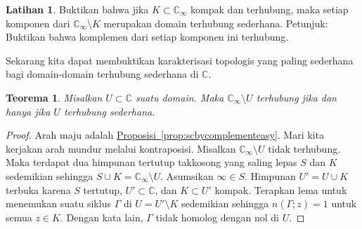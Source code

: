 \documentclass[12pt,openany]{book}
\newcommand{\C}{{\mathbb{C}}}
\theoremstyle{plain}
\newtheorem{thm}{Teorema}[section]
\theoremstyle{remark}
\theoremstyle{definition}
\newenvironment{exbox}{%
    \def\FrameCommand{\vrule width 1pt \relax\hspace{10pt}}%
    \MakeFramed{\advance\hsize-\width\FrameRestore}%
}{%
    \endMakeFramed
}
\theoremstyle{exercise}
\newtheorem{exercise}{Latihan}[section]
\theoremstyle{example}
\newcommand{\propref}[1]{\hyperref[#1]{Proposisi~\ref*{#1}}}
\begin{document}
\begin{exbox}
\begin{exercise}
Buktikan bahwa jika $K \subset \C_\infty$ kompak dan terhubung, maka
setiap komponen dari $\C_\infty \setminus K$ merupakan domain terhubung sederhana.
Petunjuk: Buktikan bahwa komplemen dari setiap komponen ini terhubung.
\end{exercise}
\end{exbox}

Sekarang kita dapat membuktikan karakterisasi topologis yang paling sederhana bagi
domain-domain terhubung sederhana di $\C$.

\begin{thm} \label{cor:scbycomplementhard}
Misalkan $U \subset \C$ suatu domain. Maka
$\C_\infty \setminus U$ terhubung jika dan hanya jika $U$ terhubung sederhana.
\end{thm}

\begin{proof}
Arah maju adalah \propref{prop:scbycomplementeasy}. Mari kita kerjakan
arah mundur melalui kontraposisi. Misalkan $\C_\infty
\setminus U$ tidak terhubung. Maka terdapat dua himpunan tertutup takkosong yang saling lepas
$S$ dan $K$ sedemikian sehingga $S \cup K = \C_\infty \setminus U$.
Asumsikan $\infty \in S$.
Himpunan $U' = U \cup K$ terbuka karena $S$ tertutup, $U' \subset \C$,
dan $K \subset U'$ kompak. Terapkan lema untuk menemukan suatu siklus
$\Gamma$ di $U = U' \setminus K$ sedemikian sehingga $n(\Gamma;z) = 1$ untuk semua $z \in
K$. Dengan kata lain, $\Gamma$ tidak homolog dengan nol di $U$.
\end{proof}
\end{document}
